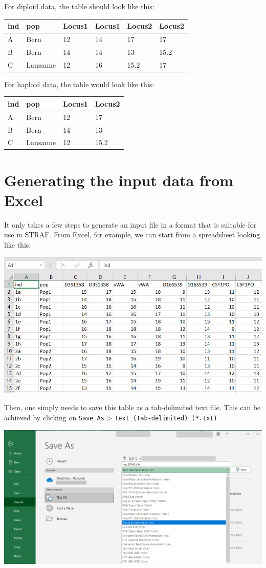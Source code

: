 \documentclass[
]{book}
\begin{document}
For diploid data, the table should look like this:

\begin{longtable}[]{@{}llllll@{}}
\toprule
ind & pop & Locus1 & Locus1 & Locus2 & Locus2\tabularnewline
\midrule
\endhead
A & Bern & 12 & 14 & 17 & 17\tabularnewline
B & Bern & 14 & 14 & 13 & 15.2\tabularnewline
C & Lausanne & 12 & 16 & 15.2 & 17\tabularnewline
\bottomrule
\end{longtable}

For haploid data, the table would look like this:

\begin{longtable}[]{@{}llll@{}}
\toprule
ind & pop & Locus1 & Locus2\tabularnewline
\midrule
\endhead
A & Bern & 12 & 17\tabularnewline
B & Bern & 14 & 13\tabularnewline
C & Lausanne & 12 & 15.2\tabularnewline
\bottomrule
\end{longtable}

\hypertarget{generating-the-input-data-from-excel}{%
\section{Generating the input data from Excel}\label{generating-the-input-data-from-excel}}

It only takes a few steps to generate an input file in a format that is suitable
for use in STRAF. From Excel, for example, we can start from a spreadsheet looking
like this:

\includegraphics[width=0.8\linewidth]{img/capture_excel_1}

Then, one simply needs to save this table as a tab-delimited text file. This can be
achieved by clicking on \texttt{Save\ As} \textgreater{} \texttt{Text\ (Tab-delimited)\ (*.txt)}

\includegraphics[width=0.8\linewidth]{img/capture_excel_2}
\end{document}
